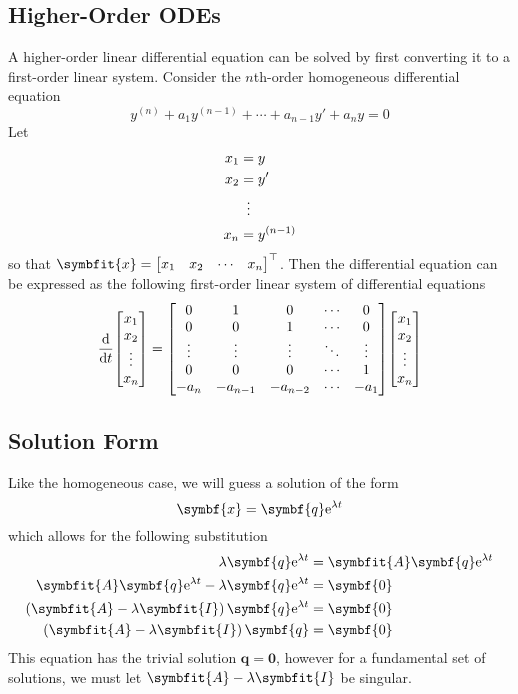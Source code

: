 \documentclass{article}
\begin{document}
\subsection{Higher-Order ODEs}
A higher-order linear differential equation can be solved by first converting it to a first-order linear 
system. Consider the $n$th-order homogeneous differential equation
\begin{equation*}
    y^{\left( n \right)} + a_1 y^{\left( n-1 \right)} + \cdots + a_{n-1} y' + a_n y = 0
\end{equation*}
Let
\begin{align*}
    x_1 &= y \\
    x_2 &= y' \\
    &\vdotswithin{=} \\
    x_n &= y^{\left( n-1 \right)}
\end{align*}
so that $\symbfit{x}=\mqty[x_1 & x_2 & \cdots & x_n]^\top$. Then the differential equation can
be expressed as the following first-order linear system of differential equations
\begin{equation*}
    \dv{t}\mqty[
        x_1 \\
        x_2 \\
        \vdotswithin{x_3} \\
        x_n	
    ] = \mqty[
        0 & 1 & 0 & \cdots & 0 \\
        0 & 0 & 1 & \cdots & 0 \\
        \vdots & \vdots & \vdots & \ddots & \vdots \\
        0 & 0 & 0 & \cdots & 1 \\
        -a_n & -a_{n-1} & -a_{n-2} & \cdots & -a_1
    ] \mqty[
        x_1 \\
        x_2 \\
        \vdotswithin{x_3} \\
        x_n	
    ]
\end{equation*}
\subsection{Solution Form}
Like the homogeneous case, we will guess a solution of the form
\begin{equation*}
    \symbf{x} = \symbf{q}\e^{\lambda t}
\end{equation*}
which allows for the following substitution
\begin{align*}
    \lambda \symbf{q}\e^{\lambda t} &= \symbfit{A} \symbf{q}\e^{\lambda t} \\
    \symbfit{A} \symbf{q}\e^{\lambda t} - \lambda \symbf{q}\e^{\lambda t} &= \symbf{0} \\
    \left( \symbfit{A} - \lambda\symbfit{I} \right) \symbf{q}\e^{\lambda t} &= \symbf{0} \\
    \left( \symbfit{A} - \lambda\symbfit{I} \right) \symbf{q} &= \symbf{0}
\end{align*}
This equation has the trivial solution $\symbf{q}=\symbf{0}$, however for a fundamental set of solutions,
we must let $\symbfit{A} - \lambda\symbfit{I}$ be singular.
\end{document}
